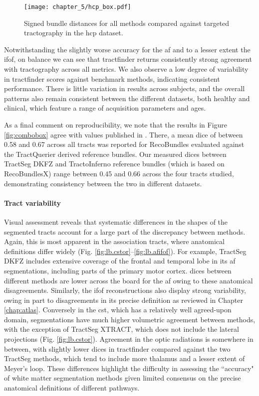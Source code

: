 \begin{SCfigure}
  \texttt{[image: chapter\_5/hcp\_box.pdf]}
  \caption{Signed bundle distances for all methods compared against targeted tractography in the \gls{hcp} dataset. }
  \label{fig:hcpbox}
\end{SCfigure}

Notwithstanding the slightly worse accuracy for the \gls{af} and to a lesser extent the \gls{ifof}, on balance we can see that tractfinder returns consistently strong agreement with tractography across all metrics.
We also observe a low degree of variability in tractfinder scores against benchmark methods, indicating consistent performance.
There is little variation in results across subjects, and the overall patterns also remain consistent between the different datasets, both healthy and clinical, which feature a range of acquisition parameters and ages.

As a final comment on reproducibility, we note that the results in Figure \ref{fig:combobox} agree with values published in \textcite{Wasserthal2018}.
There, a mean \gls{dice} of between 0.58 and 0.67 across all tracts was reported for RecoBundles evaluated against the TractQuerier derived reference bundles.
Our measured \glspl{dice} between TractSeg DKFZ and TractoInferno reference bundles (which is based on RecoBundlesX) range between 0.45 and 0.66 across the four tracts studied, demonstrating consistency between the two in different datasets.

\paragraph*{Tract variability}

Visual assessment reveals that systematic differences in the shapes of the segmented tracts account for a large part of the discrepancy between methods.
Again, this is most apparent in the association tracts, where anatomical definitions differ widely (Fig. \ref{fig:lb.cstor}--\ref{fig:lb.afifof}).
For example, TractSeg DKFZ includes extensive coverage of the frontal and temporal lobe in its \gls{af} segmentations, including parts of the primary motor cortex.
\Glspl{dice} between different methods are lower across the board for the \gls{af} owing to these anatomical disagreements.
Similarly, the \gls{ifof} reconstructions also display strong variability, owing in part to disagreements in its precise definition as reviewed in Chapter \ref{chap:atlas}.
Conversely in the \gls{cst}, which has a relatively well agreed-upon domain, segmentations have much higher volumetric agreement between methods, with the exception of TractSeg XTRACT, which does not include the lateral projections (Fig. \ref{fig:lb.cstor}).
Agreement in the optic radiations is somewhere in between, with slightly lower \glspl{dice} in tractfinder compared against the two TractSeg methods, which tend to include more thalamus and a lesser extent of Meyer's loop.
These differences highlight the difficulty in assessing the ``accuracy" of white matter segmentation methods given limited consensus on the precise anatomical definitions of different pathways.

